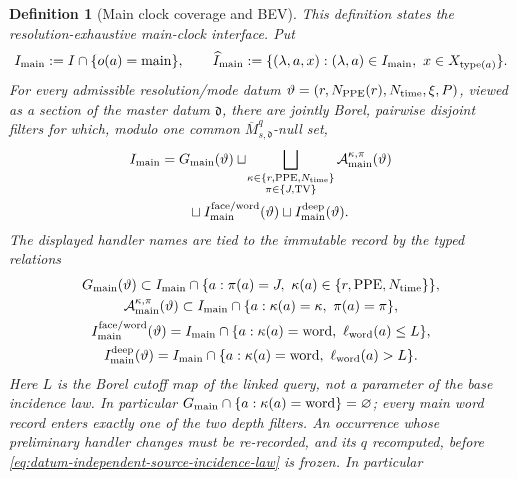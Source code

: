 \documentclass[11pt]{article}
\newtheorem{definition}[theorem]{Definition}
\begin{document}
\begin{definition}[Main clock coverage and BEV]
\label{def:main-source-BEV}
This definition states the resolution-exhaustive main-clock interface.  Put
\[
 I_{\rm main}:=I\cap\{o(a)={\rm main}\},
 \qquad
 \widehat I_{\rm main}:=
 \{(\lambda,a,x):(\lambda,a)\in I_{\rm main},\
                    x\in X_{\operatorname{type}(a)}\}.
\]
For every admissible resolution/mode datum
$\vartheta=(r,N_{\rm PPE}(r),N_{\rm time},\xi,P)$, viewed as a section of
the master datum $\mathfrak d$, there are jointly Borel,
pairwise disjoint filters for which, modulo one common
$\overline M_{s,\mathfrak d}^{q}$-null set,
\begin{equation}
\label{eq:main-clock-coverage}
\begin{aligned}
 I_{\rm main}
 &=G_{\rm main}(\vartheta)
 \sqcup\!\bigsqcup_{\substack{
      \kappa\in\{r,{\rm PPE},N_{\rm time}\}\\
      \pi\in\{J,{\rm TV}\}}}
      \mathcal A_{\rm main}^{\kappa,\pi}(\vartheta)\\
 &\qquad\sqcup I_{\rm main}^{\rm face/word}(\vartheta)
 \sqcup I_{\rm main}^{\rm deep}(\vartheta).
\end{aligned}
\end{equation}
The displayed handler names are tied to the immutable record by the typed
relations
\begin{equation}
\label{eq:main-handler-record-compatibility}
\begin{gathered}
 G_{\rm main}(\vartheta)
   \subset I_{\rm main}\cap
   \{a:\pi(a)=J,\ \kappa(a)\in\{r,{\rm PPE},N_{\rm time}\}\},\\
 \mathcal A_{\rm main}^{\kappa,\pi}(\vartheta)
   \subset I_{\rm main}\cap
      \{a:\kappa(a)=\kappa,\ \pi(a)=\pi\},\\
 I_{\rm main}^{\rm face/word}(\vartheta)
   = I_{\rm main}\cap
      \{a:\kappa(a)={\rm word},\ \ell_{\rm word}(a)\le L\},\\
 I_{\rm main}^{\rm deep}(\vartheta)
   = I_{\rm main}\cap
      \{a:\kappa(a)={\rm word},\ \ell_{\rm word}(a)>L\}.
\end{gathered}
\end{equation}
Here $L$ is the Borel cutoff map of the linked query, not a parameter of the
base incidence law.  In particular
$G_{\rm main}\cap\{a:\kappa(a)={\rm word}\}=\varnothing$; every main word
record enters exactly one of the two depth filters.  An occurrence whose preliminary handler changes must
be re-recorded, and its $q$ recomputed, before
\eqref{eq:datum-independent-source-incidence-law} is frozen.  In particular

\end{definition}
\end{document}
